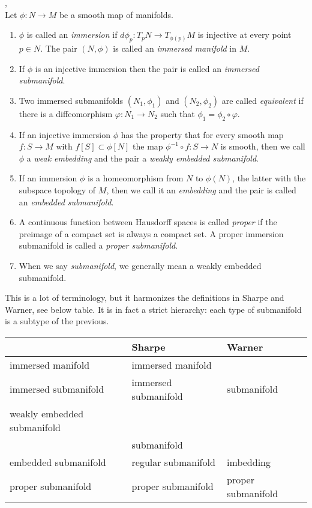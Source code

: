 \begin{definition}\textup{\cite[Def~1.27, Rem~1.33]{Warner1983},\cite[Defs~1.1.36,~1.1.40,~1.2.10,~1.2.21]{Sharpe1997}} \\
Let $\phi : N \to M$ be a smooth map of manifolds.
\begin{enumerate}
\item 
$\phi$ is called an \emph{immersion} if $d\phi_p : T_pN \to T_{\phi(p)}M$ is injective at every point $p \in N$.
The pair $(N,\phi)$ is called an \emph{immersed manifold} in $M$.
\item
If $\phi$ is an injective immersion then the pair is called an \emph{immersed submanifold}.
\item 
Two immersed submanifolds $(N_1,\phi_1)$ and $(N_2,\phi_2)$ are called \emph{equivalent} if there is a diffeomorphism $\varphi : N_1 \to N_2$ such that $\phi_1 = \phi_2 \circ \varphi$.
\item
If an injective immersion $\phi$ has the property that for every smooth map $f: S \to M$ with $f[S] \subset \phi[N]$ the map $\phi^{-1} \circ f : S \to N$ is smooth, then we call $\phi$ a \emph{weak embedding} and the pair a \emph{weakly embedded submanifold}.
\item
If an immersion $\phi$ is a homeomorphism from $N$ to $\phi(N)$, the latter with the subspace topology of $M$, then we call it an \emph{embedding} and the pair is called an \emph{embedded submanifold}.
\item
A continuous function between Hausdorff spaces is called \emph{proper} if the preimage of a compact set is always a compact set.
A proper immersion submanifold is called a \emph{proper submanifold}.
\item
When we say \emph{submanifold}, we generally mean a weakly embedded submanifold.
\end{enumerate}
\end{definition}

This is a lot of terminology, but it harmonizes the definitions in Sharpe and Warner, see below table.
It is in fact a strict hierarchy: each type of submanifold is a subtype of the previous.

\begin{table}[ht]
\begin{tabular}{l|l|l}
 & Sharpe & Warner \\ \hline
immersed manifold & immersed manifold & \\
immersed submanifold & immersed submanifold & submanifold \\
weakly embedded submanifold &  &  \\
 & submanifold &  \\
embedded submanifold & regular submanifold & imbedding \\
proper submanifold & proper submanifold & proper submanifold \\
\end{tabular}
\end{table}

